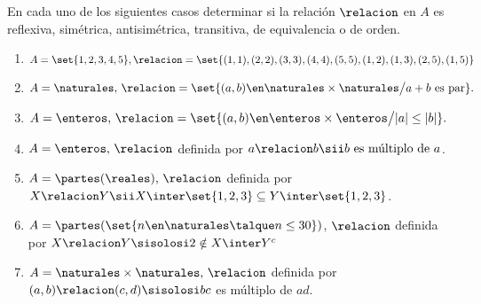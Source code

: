 \def\veintidosi{
  \begin{tikzpicture}[
    node distance=1.2cm,
    nodo/.style={circle, draw, color={##1}, inner sep=1pt, outer sep=1pt},
    arista/.style={-{Latex[length=2pt]}, ultra thin, bend left=15, color={##1}},
    rulo/.style 2 args = {-{Latex[length=2pt]}, out=##1, in=##1+45, looseness=4, color={##2}}
    ]

    \node[nodo=Cerulean] (1) {$1$};
    \node[nodo=Cerulean, above right of=1] (2) {$2$};
    \node[nodo=Cerulean, below right of=1] (3) {$3$};
    \node[nodo=Cerulean, right of=1] (5) {$5$};
    \draw[arista=Cerulean] (1) to (2);
    \draw[arista=Cerulean] (1) to (3);
    \draw[arista=Cerulean] (1) to (5);
    \draw[arista=Cerulean] (2) to (5);

    \node[nodo=Cerulean, below left of=1] (4) {$4$};

    \draw[rulo={150}{Cerulean}] (1) to (1);
    \draw[rulo={-30}{Cerulean}] (2) to (2);
    \draw[rulo={-30}{Cerulean}] (3) to (3);
    \draw[rulo={-30}{Cerulean}] (4) to (4);
    \draw[rulo={-30}{Cerulean}] (5) to (5);

    \draw[thick, rounded corners=5pt]
    ([xshift=-5pt,yshift=-5pt]current bounding box.south west)
    rectangle
    ([xshift=5pt,yshift=5pt]current bounding box.north east) node [above right] {$A$};
  \end{tikzpicture}
}
\begin{enunciado}{\ejercicio}
  En cada uno de los siguientes casos determinar si la relación $\relacion $ en $A$ es reflexiva, simétrica,
  antisimétrica, transitiva, de equivalencia o de orden.
  \begin{enumerate}[label=\roman*)]
    \item $A = \set{1,2,3,4,5}, \relacion = \set{(1,1), (2,2), (3,3), (4,4), (5,5), (1,2), (1,3), (2,5), (1,5)}$
    \item $A = \naturales,\, \relacion = \set{(a,b) \en \naturales \times \naturales \big/ a+b \text{ es par} }.$
    \item $A = \enteros,\, \relacion = \set{(a,b) \en \enteros \times \enteros \big/ |a| \leq |b| }.$
    \item $A = \enteros,\, \relacion$ definida por $a \relacion b \sii b \text{ es múltiplo de } a$.
    \item $A = \partes(\reales),\, \relacion$ definida por $X \relacion Y \sii X \inter \set{1,2,3} \subseteq Y \inter \set{1,2,3}$.
    \item $A = \partes(\set{n \en \naturales \talque n \leq 30})$, $\relacion$ definida por $X \relacion Y \sisolosi 2 \notin X \inter Y^c$
    \item $A = \naturales \times \naturales,\, \relacion$ definida por $(a,b) \relacion (c,d) \sisolosi bc$ es múltiplo de $ad$.
  \end{enumerate}

\end{enunciado}

